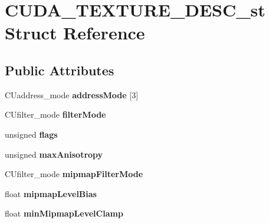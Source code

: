 \hypertarget{structCUDA__TEXTURE__DESC__st}{}\section{C\+U\+D\+A\+\_\+\+T\+E\+X\+T\+U\+R\+E\+\_\+\+D\+E\+S\+C\+\_\+st Struct Reference}
\label{structCUDA__TEXTURE__DESC__st}
\subsection*{Public Attributes}
\begin{DoxyCompactItemize}
\item 
C\+Uaddress\+\_\+mode {\bfseries address\+Mode} \mbox{[}3\mbox{]}\hypertarget{structCUDA__TEXTURE__DESC__st_aa663912dea1fc488a3f7a0d79a000dda}{}\label{structCUDA__TEXTURE__DESC__st_aa663912dea1fc488a3f7a0d79a000dda}

\item 
C\+Ufilter\+\_\+mode {\bfseries filter\+Mode}\hypertarget{structCUDA__TEXTURE__DESC__st_af0816fa2613760b19ee18896bc8d633d}{}\label{structCUDA__TEXTURE__DESC__st_af0816fa2613760b19ee18896bc8d633d}

\item 
unsigned {\bfseries flags}\hypertarget{structCUDA__TEXTURE__DESC__st_a85ee3678bf0fdeb394425f8139d12bc2}{}\label{structCUDA__TEXTURE__DESC__st_a85ee3678bf0fdeb394425f8139d12bc2}

\item 
unsigned {\bfseries max\+Anisotropy}\hypertarget{structCUDA__TEXTURE__DESC__st_aae1bafe0c4b9c7990257fb507bc25f5b}{}\label{structCUDA__TEXTURE__DESC__st_aae1bafe0c4b9c7990257fb507bc25f5b}

\item 
C\+Ufilter\+\_\+mode {\bfseries mipmap\+Filter\+Mode}\hypertarget{structCUDA__TEXTURE__DESC__st_a2672824d96e8f31fd4b4e0a5af80ac9c}{}\label{structCUDA__TEXTURE__DESC__st_a2672824d96e8f31fd4b4e0a5af80ac9c}

\item 
float {\bfseries mipmap\+Level\+Bias}\hypertarget{structCUDA__TEXTURE__DESC__st_a504e3aa4ec2888001c5145bdf8eb121c}{}\label{structCUDA__TEXTURE__DESC__st_a504e3aa4ec2888001c5145bdf8eb121c}

\item 
float {\bfseries min\+Mipmap\+Level\+Clamp}\hypertarget{structCUDA__TEXTURE__DESC__st_ad776a9f8944479154238736ee900cce8}{}\label{structCUDA__TEXTURE__DESC__st_ad776a9f8944479154238736ee900cce8}


\end{DoxyCompactItemize}
